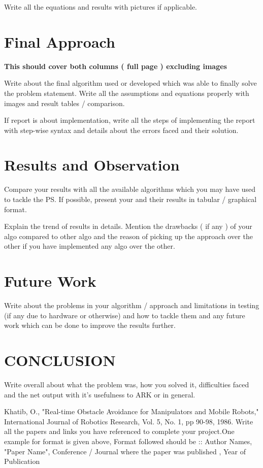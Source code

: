 \documentclass[letterpaper, 10 pt, conference]{ieeeconf}
\begin{document}
Write all the equations and results with pictures if applicable.

\section{Final Approach}
\textbf{This should cover both columns ( full page ) excluding images }

Write about the final algorithm used or developed which was able to finally solve the problem statement. Write all the assumptions and equations properly with images and result tables / comparison.

If report is about implementation, write all the steps of implementing the report with step-wise syntax and details about the errors faced and their solution.

\section{Results and Observation}

Compare your results with all the available algorithms which you may have used to tackle the PS. If possible, present your and their results in tabular / graphical format.

Explain the trend of results in details. Mention the drawbacks ( if any ) of your algo compared to other algo and the reason of picking up the approach over the other if you have implemented any algo over the other. 



\section{Future Work}

Write about the problems in your algorithm / approach and limitations in testing (if any due to hardware or otherwise) and how to tackle them and any future work which can be done to improve the results further.

\section*{CONCLUSION}

Write overall about what the problem was, how you solved it, difficulties faced and the net output with it's usefulness to ARK or in general.

\begin{thebibliography}{99} 
Khatib, 
O., "Real-time Obstacle   Avoidance 
for Manipulators   and Mobile    Robots," International Journal of 
Robotics Research, Vol. 5, No. 1, pp 90-98, 1986. 
 Write all the papers and links you have referenced to complete your project.One example for format is given above, Format followed should be :: 
 Author Names, "Paper Name", Conference / Journal where the paper was published , Year of Publication
\end{thebibliography}
\end{document}
